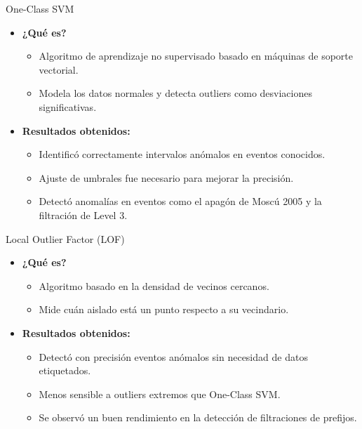 \documentclass{beamer}
\begin{document}
\begin{frame}{One-Class SVM}
    \begin{itemize}
        \item \textbf{¿Qué es?} 
        \begin{itemize}
            \item Algoritmo de aprendizaje no supervisado basado en máquinas de soporte vectorial.
            \item Modela los datos normales y detecta outliers como desviaciones significativas.
        \end{itemize}
        \item \textbf{Resultados obtenidos:}
        \begin{itemize}
            \item Identificó correctamente intervalos anómalos en eventos conocidos.
            \item Ajuste de umbrales fue necesario para mejorar la precisión.
            \item Detectó anomalías en eventos como el apagón de Moscú 2005 y la filtración de Level 3.
        \end{itemize}
    \end{itemize}
\end{frame}



\begin{frame}{Local Outlier Factor (LOF)}
    \begin{itemize}
        \item \textbf{¿Qué es?}
        \begin{itemize}
            \item Algoritmo basado en la densidad de vecinos cercanos.
            \item Mide cuán aislado está un punto respecto a su vecindario.
        \end{itemize}
        \item \textbf{Resultados obtenidos:}
        \begin{itemize}
            \item Detectó con precisión eventos anómalos sin necesidad de datos etiquetados.
            \item Menos sensible a outliers extremos que One-Class SVM.
            \item Se observó un buen rendimiento en la detección de filtraciones de prefijos.
        \end{itemize}
    \end{itemize}
\end{frame}
\end{document}
